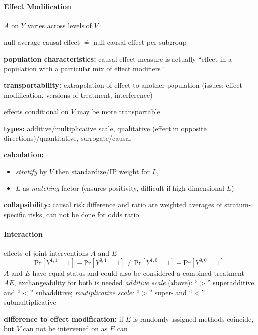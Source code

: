 \documentclass[8pt,oneside]{extarticle}
\begin{document}
\begin{multicols}{2}
\paragraph{\large Effect Modification} $A$ on $Y$ varies across levels of $V$

\noindent null average causal effect $\neq$ null causal effect per subgroup

\noindent \textbf{population characteristics:} causal effect measure is actually ``effect in a population with a particular mix of effect modifiers''

\noindent \textbf{transportability:} extrapolation of effect to another population (issues: effect modification, versions of treatment, interference)

\noindent effects conditional on $V$ may be more transportable

\noindent \textbf{types:} additive/multiplicative scale,
qualitative (effect in opposite directions)/quantitative, surrogate/causal 


\noindent \textbf{calculation:} 
\begin{itemize}[itemsep=0em, topsep=0pt, partopsep=0pt,parsep=0pt, leftmargin=1.5em]
\setlength{\itemsep}{0pt}%
\setlength{\parskip}{0pt}
\item \textit{stratify} by $V$ then standardize/IP weight for $L$, 
\item $L$ as \textit{matching} factor (ensures positivity, difficult if high-dimensional $L$)
\end{itemize}

\noindent \textbf{collapsibility:}  causal risk difference and ratio are weighted averages of stratum-specific risks, can not be done for odds ratio



\paragraph{\large Interaction} effects of joint interventions $A$ and $E$ 
$$\mathrm{Pr}\left[Y^{1,1}{=}1\right] - \mathrm{Pr}\left[Y^{0,1}{=}1\right] \neq \mathrm{Pr}\left[Y^{1,0}{=}1\right] - \mathrm{Pr}\left[Y^{0,0}{=}1\right]$$
$A$ and $E$ have equal status and could also be considered a combined treatment $AE$, exchangeability for both is needed
\textit{additive scale} (above): ``$>$'' superadditive and ``$<$'' subadditive;
\textit{multiplicative scale:} ``$>$'' super- and ``$<$'' submultiplicative

\noindent \textbf{difference to effect modification:} if $E$ is randomly assigned methods coincide, but $V$ can not be intervened on as $E$ can 


\end{multicols}
\end{document}
